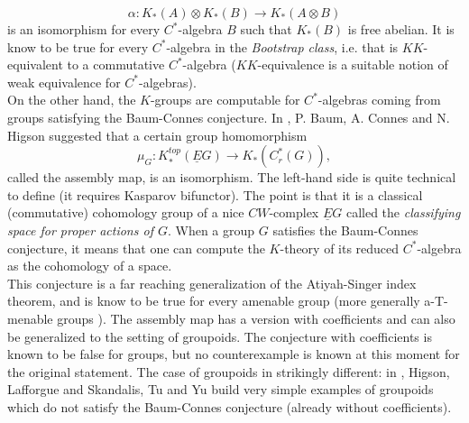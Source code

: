 \[\alpha: K_*(A) \otimes K_*(B)\rightarrow K_*(A\otimes B)\]
 is an isomorphism for every $C^*$-algebra $B$ such that $K_*(B)$ is free abelian. It is know to be true for every $C^*$-algebra in the \textit{Bootstrap class}, i.e. that is $KK$-equivalent to a commutative $C^*$-algebra ($KK$-equivalence is a suitable notion of weak equivalence for $C^*$-algebras).\\

On the other hand, the $K$-groups are computable for $C^*$-algebras coming from groups satisfying the Baum-Connes conjecture. In \cite{BaumConnesHigson}, P. Baum, A. Connes and N. Higson suggested that a certain group homomorphism
\[\mu_G : K_*^{top}(\underline E G) \rightarrow K_*(C_r^*(G)), \]
called the assembly map, is an isomorphism. The left-hand side is quite technical to define (it requires Kasparov bifunctor). The point is that it is a classical (commutative) cohomology group of a nice $CW$-complex $\underline E G$ called the \textit{classifying space for proper actions of $G$}. When a group $G$ satisfies the Baum-Connes conjecture, it means that one can compute the $K$-theory of its reduced $C^*$-algebra as the cohomology of a space.\\ 

This conjecture is a far reaching generalization of the Atiyah-Singer index theorem, and is know to be true for every amenable group (more generally a-T-menable groups \cite{HigsonKasparov}). The assembly map has a version with coefficients and can also be generalized to the setting of groupoids. The conjecture with coefficients is known to be false for groups, but no counterexample is known at this moment for the original statement. The case of groupoids in strikingly different: in \cite{HigsonLaffSk}, Higson, Lafforgue and Skandalis, Tu and Yu build very simple examples of groupoids which do not satisfy the Baum-Connes conjecture (already without coefficients).\\

